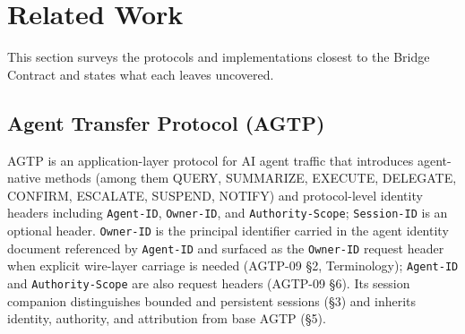 \section{Related Work}
\label{sec:related-work}

This section surveys the protocols and implementations closest to the
Bridge Contract and states what each leaves uncovered.

\subsection{Agent Transfer Protocol (AGTP)}\label{sec:rw-agtp}

AGTP \cite{I-D.hood-agtp} is an application-layer protocol for AI agent
traffic that introduces agent-native methods (among them QUERY, SUMMARIZE, EXECUTE,
DELEGATE, CONFIRM, ESCALATE, SUSPEND, NOTIFY) and protocol-level identity
headers including \texttt{Agent-ID}, \texttt{Owner-ID}, and
\texttt{Authority-Scope}; \texttt{Session-ID} is an optional header.
\texttt{Owner-ID} is the principal identifier carried in the agent
identity document referenced by \texttt{Agent-ID} and surfaced as the
\texttt{Owner-ID} request header when explicit wire-layer carriage is
needed (AGTP-09 \S 2, Terminology); \texttt{Agent-ID} and \texttt{Authority-Scope}
are also request headers (AGTP-09 \S 6). Its
session companion \cite{I-D.hood-agtp-session} distinguishes bounded and
persistent sessions (\S 3) and inherits identity, authority, and
attribution from base AGTP (\S 5).

